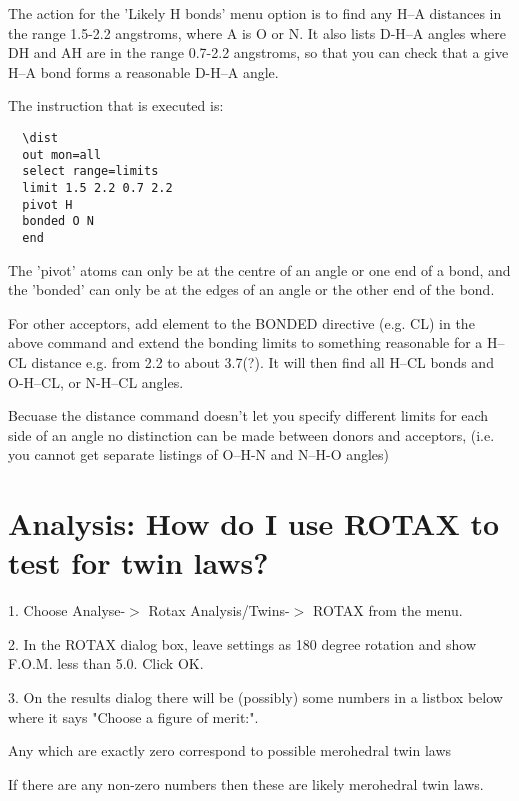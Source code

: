 \documentclass[10pt,a4paper]{report}
\begin{document}
The action for the 'Likely H bonds' menu option is to find any H--A 
distances in the range 1.5-2.2 angstroms, where A is O or N. It also 
lists D-H--A angles where DH and AH are in the range 0.7-2.2 angstroms, 
so that you can check that a give H--A bond forms a reasonable D-H--A angle.



The instruction that is executed is:
\small\begin{verbatim} 
  \dist
  out mon=all
  select range=limits
  limit 1.5 2.2 0.7 2.2
  pivot H
  bonded O N
  end
\end{verbatim}\normalsize


The 'pivot' atoms can only be at the centre of an angle or one end
of a bond, and the 'bonded' can only be at the edges of an angle or the
other end of the bond. 



For other acceptors, add element to the BONDED directive (e.g. CL) in the above 
command and extend the bonding limits to something reasonable for a H--CL distance
e.g. from 2.2 to about 3.7(?). It will then find all H--CL bonds and O-H--CL, or
N-H--CL angles.



Becuase the distance command doesn't let you specify different limits for each
side of an angle no distinction can be made between donors and acceptors, (i.e. you
cannot get separate listings of O--H-N and N--H-O angles)



\section{Analysis: How do I use ROTAX to test for twin laws?}



 1. Choose Analyse-$>$ Rotax Analysis/Twins-$>$ ROTAX from the menu.



 2. In the ROTAX dialog box, leave settings as 180 degree rotation 
    and show F.O.M. less than 5.0. Click OK.



 3. On the results dialog there will be (possibly) some numbers in a listbox
    below where it says "Choose a figure of merit:".


    Any which are exactly zero correspond to possible merohedral twin
    laws


    If there are any non-zero numbers then these are likely merohedral 
    twin laws.
\end{document}
